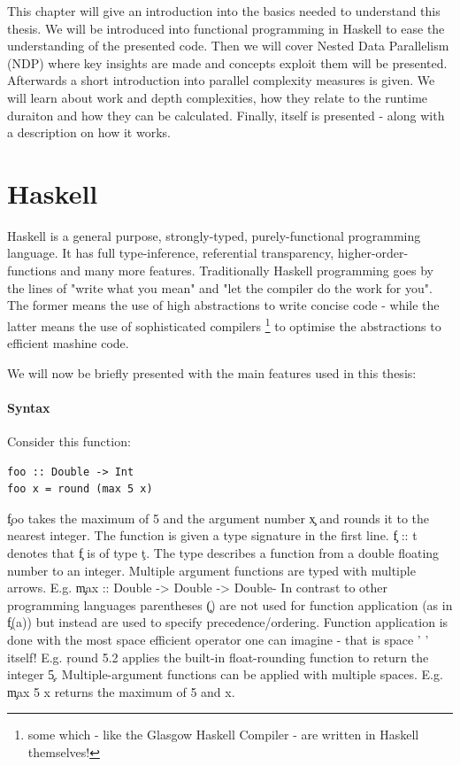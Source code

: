 

This chapter will give an introduction into the basics needed to
understand this thesis. We will be introduced into functional programming
in Haskell to ease the understanding of the presented code.
Then we will cover Nested Data Parallelism (NDP) where
key insights are made and concepts exploit them will be presented.
Afterwards a short introduction into parallel complexity measures is given.
We will learn about work and depth complexities, how they relate
to the runtime duraiton and how they can be calculated.
Finally, \algo itself is presented - along with
a description on how it works.

\section{Haskell}
  Haskell is a general purpose, strongly-typed, purely-functional programming
  language. It has full type-inference, referential transparency, higher-order-functions
  and many more features. Traditionally Haskell programming goes by the lines of
  "write what you mean" and "let the compiler do the work for you".
  The former means the use of high abstractions to write concise code -
  while the latter means the use of sophisticated compilers
  \footnote{some which - like the Glasgow Haskell Compiler -  are written in Haskell themselves!}
  to optimise the abstractions to efficient mashine code.
  
  We will now be briefly presented with the main features used in this thesis:
  \paragraph{Syntax}
  Consider this function:
  \begin{lstlisting}
foo :: Double -> Int
foo x = round (max 5 x)
  \end{lstlisting}
  \c{foo} takes the maximum of 5 and the argument number \c{x} and
  rounds it to the nearest integer. The function is given a type
  signature in the first line. \c{f :: t} denotes that \c{f} is of type \c{t}.
  The type describes a function from a double floating number
  to an integer. Multiple argument functions are typed with multiple arrows.
  E.g. \c{max :: Double -> Double -> Double}-
  In contrast to other programming languages parentheses \c{()} are not used for function application
  (as in \c{f(a)}) but instead are used to specify precedence/ordering.
  Function application is done with the most space efficient operator
  one can imagine - that is space ' ' itself! E.g. \c{round 5.2} applies the built-in
  float-rounding function to return the integer \c{5}. Multiple-argument
  functions can be applied with multiple spaces. E.g. \c{max 5 x}
  returns the maximum of 5 and x.
  
